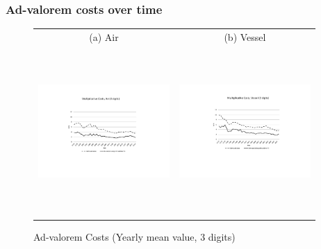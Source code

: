 \documentclass[10 pt,Helvetica, french]{beamer}
\begin{document}
\begin{frame}[label=app_fig1]
\frametitle{Ad-valorem costs over time \hyperlink{slide_fig1}{}}
\begin{figure}[htbp]
\caption{Ad-valorem Costs (Yearly mean value, 3 digits)}
\label{fig:mult_alone_withadd}
\begin{center}
\begin{tabular}{cc}
{\small (a) Air } & {\small (b) Vessel}\\
\includegraphics[width=5cm, height=2.5in]{Fig1a_mult_air_3d.pdf}
& \includegraphics[width=5cm,height=2.5in]{Fig1b_mult_vessel_3d.pdf} \\
\end{tabular}
\end{center}
\end{figure}

\end{frame}
\end{document}
